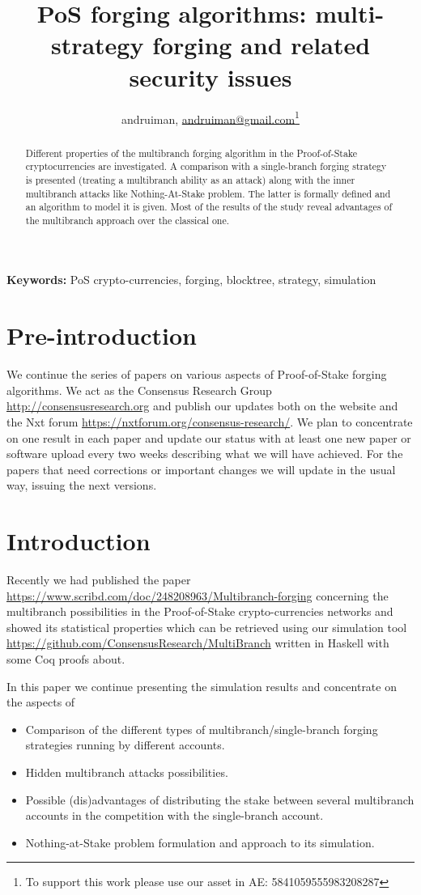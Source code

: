 \documentclass[12pt]{article}
\author{andruiman, \href{maito: andruiman@gmail.com}{andruiman@gmail.com}\footnote{To support this work please use our asset in AE: 5841059555983208287}}
\title{PoS forging algorithms: multi-strategy forging and related security issues}
\begin{document}
\maketitle
\begin{abstract}
Different properties of the multibranch forging algorithm in the Proof-of-Stake cryptocurrencies are investigated. A comparison with a single-branch
forging strategy is presented (treating a multibranch ability as an attack) along with the inner multibranch attacks like Nothing-At-Stake problem.
The latter is formally defined and an algorithm to model it is given. Most of the results of the study reveal advantages of the multibranch approach
over the classical one.   
\end{abstract}

\noindent
{\bf Keywords:} PoS crypto-currencies, forging, blocktree, strategy, simulation

\section{Pre-introduction}

We continue the series of papers on various aspects of Proof-of-Stake forging algorithms. We act as the Consensus Research 
Group \url{http://consensusresearch.org} and publish our updates both on the website and the Nxt forum \url{https://nxtforum.org/consensus-research/}.
We plan to concentrate on one result in each paper and update our status with at least one new paper or software upload every two weeks describing 
what we will have achieved. For the papers that need corrections or important changes we will update in the usual way,
issuing the next versions. 

\section{Introduction}

Recently we had published the paper \url{https://www.scribd.com/doc/248208963/Multibranch-forging} concerning the multibranch possibilities 
in the Proof-of-Stake crypto-currencies networks and showed its statistical properties which can be retrieved using our simulation tool 
\url{https://github.com/ConsensusResearch/MultiBranch} written in Haskell with some Coq proofs about. 

In this paper we continue presenting the simulation results and concentrate on the aspects of
\begin{itemize}
\item[1.] {Comparison of the different types of multibranch/single-branch forging strategies running by different accounts.}
\item[2.] {Hidden multibranch attacks possibilities.}
\item[3.] {Possible (dis)advantages of distributing the stake between several multibranch accounts in the competition with the single-branch account.}
\item[3.] {Nothing-at-Stake problem formulation and approach to its simulation.}
\end{itemize}
\end{document}
